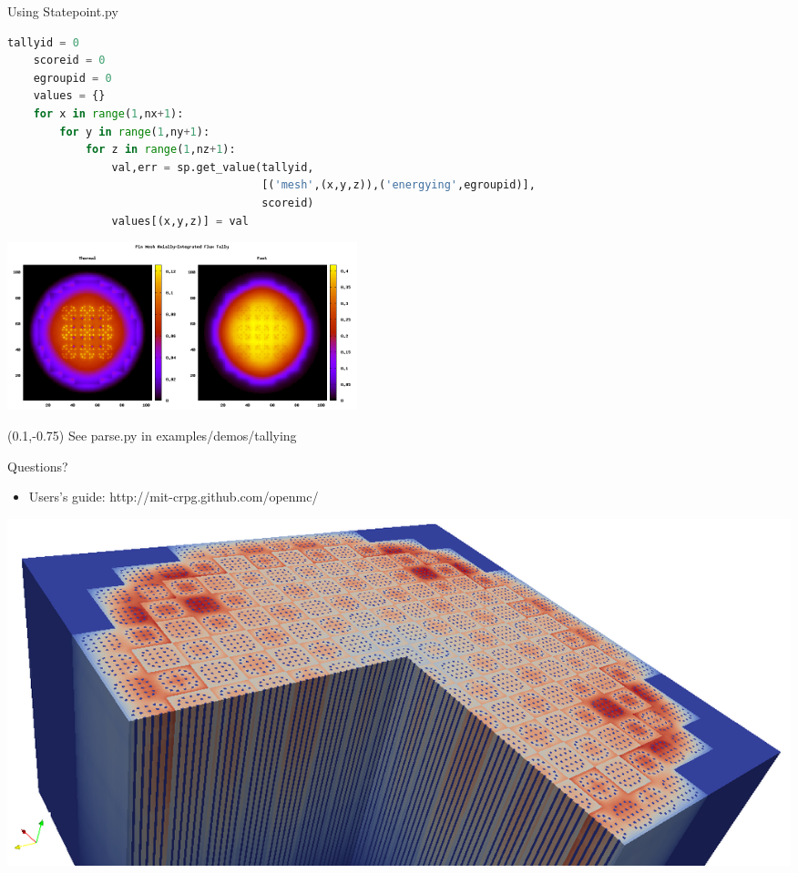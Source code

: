\documentclass[serif]{beamer}
\begin{document}

\begin{frame}[fragile]{Using Statepoint.py}

  \begingroup
    \fontsize{5pt}{5.8pt}\selectfont
    \begin{lstlisting}[language=Python,backgroundcolor=\color{gray!20},frame=single]
    tallyid = 0
    scoreid = 0
    egroupid = 0
    values = {}
    for x in range(1,nx+1):
        for y in range(1,ny+1):
            for z in range(1,nz+1):
                val,err = sp.get_value(tallyid,
                                       [('mesh',(x,y,z)),('energying',egroupid)],
                                       scoreid)
                values[(x,y,z)] = val
    \end{lstlisting}
  \endgroup
      
  \centering
  
  \includegraphics[width=4in]{src/fluxplot.png}

  \setlength{\TPHorizModule}{\framewidth}
  \setlength{\TPVertModule}{\paperheight}
  \begin{textblock}{1}(0.1,-0.75)
    See parse.py in examples/demos/tallying
  \end{textblock}

\end{frame}


\begin{frame}{Questions?}

  \begin{itemize}
    \item Users's guide: http://mit-crpg.github.com/openmc/
  \end{itemize}
  
  \centering
  \includegraphics[width=\linewidth]{src/3dcore.png}
      
\end{frame}



\end{document}
